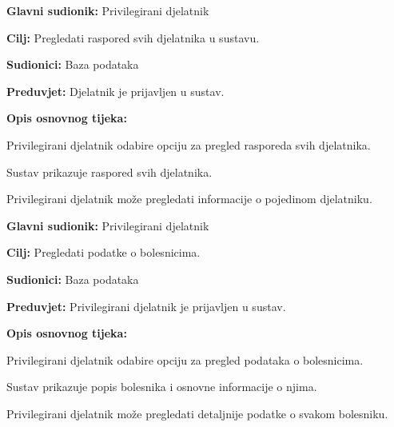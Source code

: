 \vspace{1em} %
\noindent{}
\begin{packed_item}
	\item \textbf{Glavni sudionik:} Privilegirani djelatnik
	\item \textbf{Cilj:} Pregledati raspored svih djelatnika u sustavu.
	\item \textbf{Sudionici:} Baza podataka
	\item \textbf{Preduvjet:} Djelatnik je prijavljen u sustav.
	\item \textbf{Opis osnovnog tijeka:}
	\begin{packed_enum}
		\item Privilegirani djelatnik odabire opciju za pregled rasporeda svih djelatnika.
		\item Sustav prikazuje raspored svih djelatnika.
		\item Privilegirani djelatnik može pregledati informacije o pojedinom djelatniku.
	\end{packed_enum}
\end{packed_item}

\vspace{1em} %
\noindent{}
\begin{packed_item}
	\item \textbf{Glavni sudionik:} Privilegirani djelatnik
	\item \textbf{Cilj:} Pregledati podatke o bolesnicima.
	\item \textbf{Sudionici:} Baza podataka
	\item \textbf{Preduvjet:} Privilegirani djelatnik je prijavljen u sustav.
	\item \textbf{Opis osnovnog tijeka:}
	\begin{packed_enum}
		\item Privilegirani djelatnik odabire opciju za pregled podataka o bolesnicima.
		\item Sustav prikazuje popis bolesnika i osnovne informacije o njima.
		\item Privilegirani djelatnik može pregledati detaljnije podatke o svakom bolesniku.
	\end{packed_enum}
\end{packed_item}

